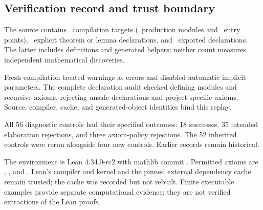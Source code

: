 \subsection{Verification record and trust boundary}
The source contains \EditionTargets\ compilation targets (\EditionProductionModules\ production modules and \EditionRoots\ entry points), \EditionTheorems\ explicit theorem or lemma declarations, and \EditionDeclarations\ exported declarations. The latter includes definitions and generated helpers; neither count measures independent mathematical discoveries.

Fresh compilation treated warnings as errors and disabled automatic implicit parameters. The complete declaration audit checked defining modules and recursive axioms, rejecting unsafe declarations and project-specific axioms. Source, compiler, cache, and generated-object identities bind this replay.

All 56 diagnostic controls had their specified outcomes: 18 successes, 35 intended elaboration rejections, and three axiom-policy rejections. The 52 inherited controls were rerun alongside four new controls. Earlier records remain historical.

The environment is Lean 4.34.0-rc2 with mathlib commit
.
Permitted axioms are , , and . Lean's compiler and kernel and the pinned external dependency cache remain trusted; the cache was recorded but not rebuilt. Finite executable examples provide separate computational evidence; they are not verified extractions of the Lean proofs.
